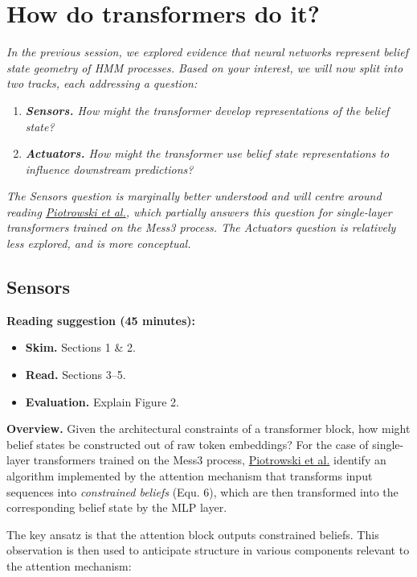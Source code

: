 \documentclass[11pt]{article}
\begin{document}
\section{How do transformers do it?}\label{how-transformers-do-it}
\emph{In the previous session, we explored evidence that neural networks represent belief state geometry of HMM processes. Based on your interest, we will now split into two tracks, each addressing a question:}

\begin{enumerate}
\item
  \emph{\textbf{Sensors.} How might the transformer develop representations of the belief state?}
\item
  \emph{\textbf{Actuators.} How might the transformer use belief state representations to influence downstream predictions?}
\end{enumerate}

\emph{The Sensors question is marginally better understood and will centre around reading \href{https://arxiv.org/pdf/2502.01954}{Piotrowski et al.}, which partially answers this question for single-layer transformers trained on the Mess3 process. The Actuators question is relatively less explored, and is more conceptual.}

\subsection{Sensors }\label{sensors}

\textbf{Reading suggestion (45 minutes):}

\begin{itemize}
\item
  \textbf{Skim.} Sections 1 \& 2.
\item
  \textbf{Read.} Sections 3--5.
\item
  \textbf{Evaluation.} Explain Figure 2.
\end{itemize}

\textbf{Overview.} Given the architectural constraints of a transformer block, how might belief states be constructed out of raw token embeddings? For the case of single-layer transformers trained on the Mess3 process, \href{https://arxiv.org/pdf/2502.01954}{Piotrowski et al.} identify an algorithm implemented by the attention mechanism that transforms input sequences into \emph{constrained beliefs} (Equ. 6), which are then transformed into the corresponding belief state by the MLP layer.

The key ansatz is that the attention block outputs constrained beliefs. This observation is then used to anticipate structure in various components relevant to the attention mechanism:
\end{document}
